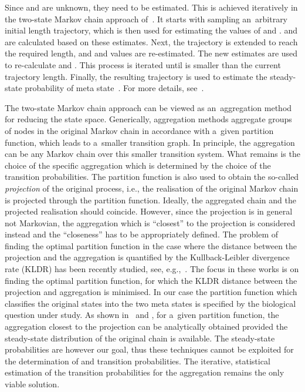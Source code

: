 \documentclass[runningheads,a4paper]{llncs}
\begin{document}
Since  and  are unknown, they need to be estimated. This is achieved iteratively in
the two-state Markov chain approach of~\cite{RL92}. It starts with sampling an~arbitrary initial
length trajectory, which is then used for estimating the values of  and .  and
 are calculated based on these estimates. Next, the trajectory is extended to reach the
required length, and  and  values are re-estimated. The new estimates are used to
re-calculate  and . This process is iterated until  is smaller than the current
trajectory length. Finally, the resulting trajectory is used to estimate the steady-state
probability of meta state~. For more details, see~\cite{RL92}.


The two-state Markov chain approach can be viewed as an~aggregation method for reducing the state
space. Generically, aggregation methods aggregate groups of nodes in the original Markov chain in
accordance with a~given partition function, which leads to a~smaller transition graph. In
principle, the aggregation can be any Markov chain over this smaller transition system. What
remains is the choice of the specific aggregation which is determined by the choice of the
transition probabilities. The partition function is also used to obtain the so-called
\emph{projection} of the original process, i.e., the realisation of the original Markov chain is
projected through the partition function. Ideally, the aggregated chain and the projected
realisation should coincide. However, since the projection is in general not Markovian, the
aggregation which is ``closest'' to the projection is considered instead and the ``closeness'' has
to be appropriately defined. The problem of finding the optimal partition function in the case
where the distance between the projection and the aggregation is quantified by the
Kullback-Leibler divergence rate (KLDR) has been recently studied, see,
e.g.,~\cite{DMM09,DMM11,GPKK15}. The focus in these works is on finding the optimal partition
function, for which the KLDR distance between the projection and aggregation is minimised.
In our case the partition function which classifies the original states into the two meta states
is specified by the biological question under study. As shown in~\cite{DMM11} and \cite{GPKK15},
for a~given partition function, the aggregation closest to the projection can be analytically
obtained provided the steady-state distribution of the original chain is available. The
steady-state probabilities are however our goal, thus these techniques cannot be exploited for the
determination of  and  transition probabilities. The iterative, statistical
estimation of the transition probabilities for the aggregation remains the only viable
solution.
\end{document}
